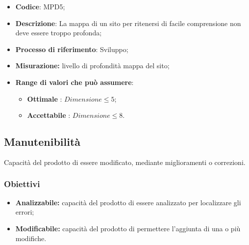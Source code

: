 \vspace{-1cm}
\begin{itemize}
	\item \textbf{Codice}: MPD5;
	\item \textbf{Descrizione}: La mappa di un sito per ritenersi di facile comprensione non deve essere troppo profonda;
	\item \textbf{Processo di riferimento}: Sviluppo;
	\item \textbf{Misurazione:} livello di profondità mappa del sito;
	\item \textbf{Range di valori che può assumere}: 
		\begin{itemize}
			\item \textbf{Ottimale} : $Dimensione \leq5$;
			\item \textbf{Accettabile} : $Dimensione \leq8$.
		\end{itemize}
\end{itemize}
\subsection{Manutenibilità}
Capacità del prodotto di essere modificato, mediante miglioramenti o correzioni.
\subsubsection{Obiettivi}
\begin{itemize}
	\item \textbf{Analizzabile:} capacità del prodotto di essere analizzato per localizzare gli errori;
	\item \textbf{Modificabile:} capacità del prodotto di permettere l'aggiunta di una o più modifiche.
\end{itemize}
